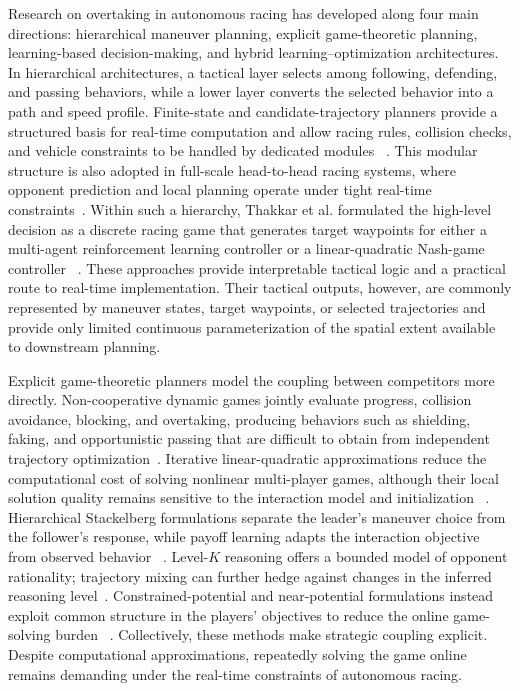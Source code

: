 \documentclass[journal,twoside,web]{ieeecolor}
\begin{document}
Research on overtaking in autonomous racing has developed along four main
directions: hierarchical maneuver planning, explicit game-theoretic planning,
learning-based decision-making, and hybrid learning--optimization
architectures.
In hierarchical architectures, a tactical layer selects among following,
defending, and passing behaviors, while a lower layer converts the selected
behavior into a path and speed profile.
Finite-state and candidate-trajectory planners provide a structured basis for
real-time computation and allow racing rules, collision checks, and vehicle
constraints to be handled by dedicated modules
~\cite{sureshbabu2022autopass,kim2023hierarchical}.
This modular structure is also adopted in full-scale head-to-head racing
systems, where opponent prediction and local planning operate under tight
real-time constraints~\cite{jung2023iac,hoffmann2026a2rl}.
Within such a hierarchy, Thakkar et al. formulated the high-level decision as
a discrete racing game that generates target waypoints for either a multi-agent
reinforcement learning controller or a linear-quadratic Nash-game controller
~\cite{thakkar2024hierarchical}.
These approaches provide interpretable tactical logic and a practical route to
real-time implementation. Their tactical outputs, however, are commonly
represented by maneuver states, target waypoints, or selected trajectories and
provide only limited continuous parameterization of the spatial extent
available to downstream planning.

Explicit game-theoretic planners model the coupling between competitors more
directly. Non-cooperative dynamic games jointly evaluate progress, collision
avoidance, blocking, and overtaking, producing behaviors such as shielding,
faking, and opportunistic passing that are difficult to obtain from independent
trajectory optimization~\cite{liniger2019game,wang2021game}. 
Iterative linear-quadratic approximations reduce the computational cost of
solving nonlinear multi-player games, although their local solution quality
remains sensitive to the interaction model and initialization
~\cite{fridovich2020ilqgames}.
Hierarchical Stackelberg formulations separate
the leader's maneuver choice from the follower's response, while payoff
learning adapts the interaction objective from observed behavior
~\cite{ji2023hierarchicalgame,lopez2022payoff}. Level-$K$ reasoning offers a
bounded model of opponent rationality; trajectory mixing can further hedge
against changes in the inferred reasoning level~\cite{ji2024competition}.
Constrained-potential and near-potential formulations instead exploit common
structure in the players' objectives to reduce the online game-solving burden
~\cite{jia2023bayesian,kalaria2025alpha}.  
Collectively, these methods make strategic coupling explicit. Despite
computational approximations, repeatedly solving the game online remains
demanding under the real-time constraints of autonomous racing.
\end{document}
